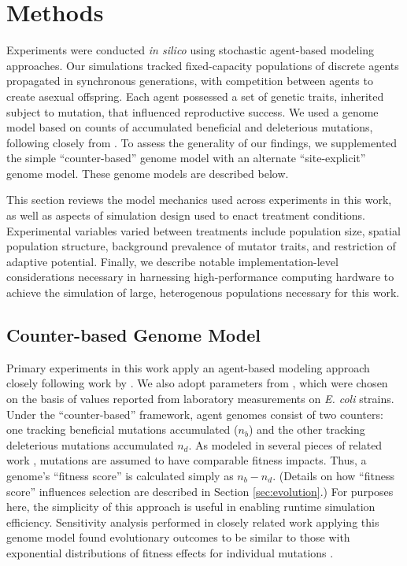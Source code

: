 \section{Methods} \label{sec:methods}

Experiments were conducted \textit{in silico} using stochastic agent-based modeling approaches.
Our simulations tracked fixed-capacity populations of discrete agents propagated in synchronous generations, with competition between agents to create asexual offspring.
Each agent possessed a set of genetic traits, inherited subject to mutation, that influenced reproductive success.
We used a genome model based on counts of accumulated beneficial and deleterious mutations, following closely from \citep{raynes2018sign}.
To assess the generality of our findings, we supplemented the simple ``counter-based'' genome model with an alternate ``site-explicit'' genome model.
These genome models are described below.

This section reviews the model mechanics used across experiments in this work, as well as aspects of simulation design used to enact treatment conditions.
Experimental variables varied between treatments include population size, spatial population structure, background prevalence of mutator traits, and restriction of adaptive potential.
Finally, we describe notable implementation-level considerations necessary in harnessing high-performance computing hardware to achieve the simulation of large, heterogenous populations necessary for this work.

\subsection{Counter-based Genome Model} \label{sec:poisson}

Primary experiments in this work apply an agent-based modeling approach closely following work by \citet{raynes2018sign}.
We also adopt parameters from \citet{raynes2018sign}, which were chosen on the basis of values reported from laboratory measurements on \textit{E. coli} strains\citep{wloch2001direct,frenkel2014fates,joseph2004spontaneous,levy2015quantitative,zeyl2001estimates}.
Under the ``counter-based'' framework, agent genomes consist of two counters: one tracking beneficial mutations accumulated ($n_b$) and the other tracking deleterious mutations accumulated $n_d$.
As modeled in several pieces of related work \citep{tenaillon1999mutators,travis2002mutator,raynes2019migration,tanaka2003evolution,wylie2009fixation}, mutations are assumed to have comparable fitness impacts.
Thus, a genome’s ``fitness score'' is calculated simply as $n_b - n_d$.
(Details on how ``fitness score'' influences selection are described in Section \ref{sec:evolution}.)
For purposes here, the simplicity of this approach is useful in enabling runtime simulation efficiency.
Sensitivity analysis performed in closely related work applying this genome model found evolutionary outcomes to be similar to those with exponential distributions of fitness effects for individual mutations \citep{raynes2019selection}.


